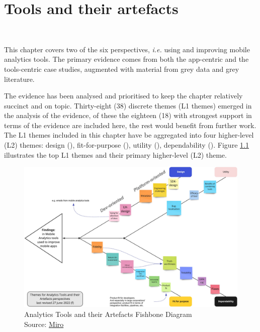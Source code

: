 \chapter{Tools and their artefacts}~\label{chapter-tools-and-their-artefacts}

This chapter covers two of the six perspectives, \emph{i.e.} using and improving mobile analytics tools. The primary evidence comes from both the app-centric and the tools-centric case studies, augmented with material from grey data and grey literature.

The evidence has been analysed and prioritised to keep the chapter relatively succinct and on topic. Thirty-eight (38) discrete themes (L1 themes) emerged in the analysis of the evidence, of these the eighteen (18) with strongest support in terms of the evidence are included here, the rest would benefit from further work. The L1 themes included in this chapter have be aggregated into four higher-level (L2) themes: design (), fit-for-purpose (), utility (), dependability (). Figure \ref{fig:analytics-tools-and-their-artefacts-fishbone-diagram} illustrates the top L1 themes and their primary higher-level (L2) theme.

\begin{figure}
    \centering
    \includegraphics[width=\textwidth]{images/rough-sketches/analytics-tools-and-their-artefacts-fishbone-diagram-27-jun-2022f.jpeg}
    \caption{Analytics Tools and their Artefacts Fishbone Diagram\\Source: \href{https://miro.com/app/board/uXjVOtIsyWo=/?share_link_id=293061080490}{Miro}}
    \label{fig:analytics-tools-and-their-artefacts-fishbone-diagram}
\end{figure}


